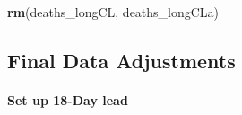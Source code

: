 \documentclass[
]{article}
\newenvironment{Shaded}{\begin{snugshade}}{\end{snugshade}}
\newcommand{\KeywordTok}[1]{\textcolor[rgb]{0.13,0.29,0.53}{\textbf{#1}}}
\newcommand{\NormalTok}[1]{#1}
\begin{document}
\begin{Shaded}
\begin{Highlighting}[]
\KeywordTok{rm}\NormalTok{(deaths_longCL, deaths_longCLa)}
\end{Highlighting}
\end{Shaded}

\hypertarget{final-data-adjustments}{%
\subsection{Final Data Adjustments}\label{final-data-adjustments}}

\hypertarget{set-up-18-day-lead}{%
\paragraph{Set up 18-Day lead}\label{set-up-18-day-lead}}
\end{document}
